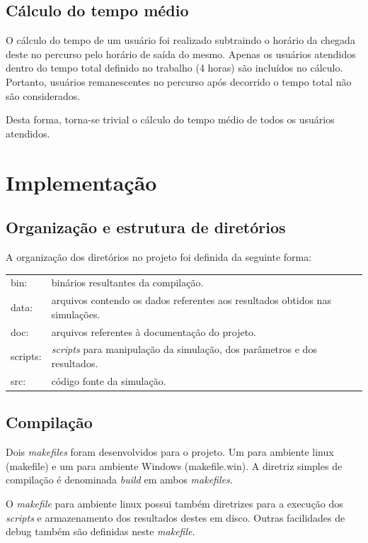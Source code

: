 \documentclass{article}
\begin{document}
\subsection{Cálculo do tempo médio}
O cálculo do tempo de um usuário foi realizado subtraindo o horário da chegada deste no percurso pelo horário de saída do mesmo. Apenas os usuários atendidos dentro do tempo total definido no trabalho (4 horas) são incluídos no cálculo. Portanto, usuários remanescentes no percurso após decorrido o tempo total não são considerados.

Desta forma, torna-se trivial o cálculo do tempo médio de todos os usuários atendidos.


\section{Implementação}

\subsection{Organização e estrutura de diretórios}
A organização dos diretórios no projeto foi definida da seguinte forma:

\begin{tabular}{ll}
  bin:& binários resultantes da compilação.\\
  data:& arquivos contendo os dados referentes aos resultados obtidos nas simulações.\\
  doc:& arquivos referentes à documentação do projeto.\\
  scripts:& \textit{scripts} para manipulação da simulação, dos parâmetros e dos resultados.\\
  src:& código fonte da simulação.
\end{tabular}

\subsection{Compilação}
Dois \textit{makefiles} foram desenvolvidos para o projeto. Um para ambiente linux (makefile) e um para ambiente Windows (makefile.win). A diretriz simples de compilação é denominada \textit{build} em ambos \textit{makefiles}.

O \textit{makefile} para ambiente linux possui também diretrizes para a execução dos \textit{scripts} e armazenamento dos resultados destes em disco. Outras facilidades de debug também são definidas neste \textit{makefile}.
\end{document}

